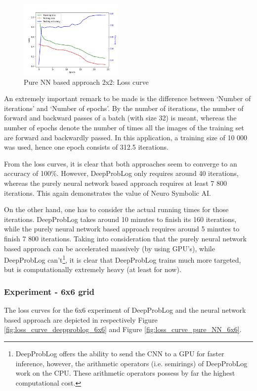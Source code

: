 \documentclass[english]{sobraep}
\begin{document}
\begin{figure}[htp]
    \begin{center}
    \includegraphics[width=0.45\textwidth]{loss_curve_pure_NN_2x2.png} 
    \captionsetup{justification=centering}
    \caption{Pure NN based approach 2x2: Loss curve}
    \label{fig:loss_curve_pure_NN_2x2}
    \end{center}
\end{figure}
An extremely important remark to be made is the difference between `Number of iterations' and `Number of epochs'. By the number of iterations, the number of forward and backward passes of a batch (with size 32) is meant, whereas the number of epochs denote the number of times all the images of the training set are forward and backwardly passed. In this application, a training size of 10 000 was used, hence one epoch consists of 312.5 iterations.

From the loss curves, it is clear that both approaches seem to converge to an accuracy of 100\%. However, DeepProbLog only requires around 40 iterations, whereas the purely neural network based approach requires at least 7 800 iterations. This again demonstrates the value of Neuro Symbolic AI.

On the other hand, one has to consider the actual running times for those iterations. DeepProbLog takes around 10 minutes to finish its 160 iterations, while the purely neural network based approach requires around 5 minutes to finish 7 800 iterations. Taking into consideration that the purely neural network based approach can be accelerated massively (by using GPU's), while DeepProbLog can't\footnote{DeepProbLog offers the ability to send the CNN to a GPU for faster inference, however, the arithmetic operators (i.e. semirings) of DeepProbLog work on the CPU. These arithmetic operators possess by far the highest computational cost.}, it is clear that DeepProbLog trains much more targeted, but is computationally extremely heavy (at least for now).

\subsubsection{Experiment - 6x6 grid}
The loss curves for the 6x6 experiment of DeepProbLog and the neural network based approach are depicted in respectively Figure \ref{fig:loss_curve_deepproblog_6x6} and Figure \ref{fig:loss_curve_pure_NN_6x6}.
\end{document}
